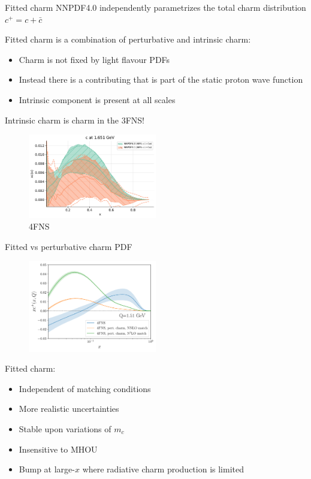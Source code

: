 \documentclass[aspectratio=43, 8pt,t]{beamer}
\begin{document}
\begin{frame}{Fitted charm}
  NNPDF4.0 independently parametrizes the total charm distribution $c^+=c+\bar{c}$

  \vspace*{1em}
  Fitted charm is a combination of perturbative and intrinsic charm: \\
  \begin{itemize}
    \item Charm is not fixed by light flavour PDFs
    \item Instead there is a contributing that is part of the static proton wave function
    \item Intrinsic component is present at all scales
  \end{itemize}

  \vspace*{1em}
  Intrinsic charm is charm in the 3FNS!

  \begin{figure}
    \includegraphics[width=0.5\textwidth]{nnpdf40_vs_nnpdf31.pdf}
    \caption*{4FNS}
  \end{figure}
\end{frame}

\begin{frame}{Fitted vs perturbative charm PDF}
  \begin{figure}
    \includegraphics[width=0.5\textwidth]{pch_vs_fitted_forward.pdf}
  \end{figure}

  Fitted charm:
  \begin{itemize}
    \item Independent of matching conditions
    \item More realistic uncertainties
    \item Stable upon variations of $m_c$
    \item Insensitive to MHOU
    \item Bump at large-$x$ where radiative charm production is limited
  \end{itemize}
\end{frame}
\end{document}
